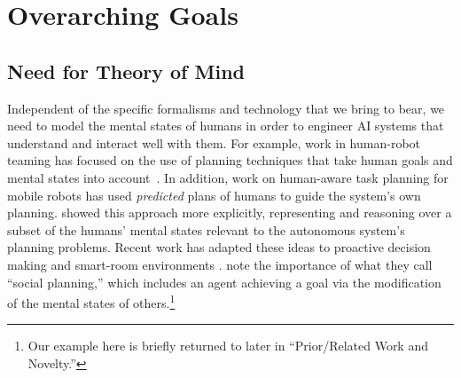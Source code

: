 \section{Overarching Goals}\label{ref:overarching_goals}

\subsection{Need for Theory of Mind}
Independent of the specific formalisms and technology
that we bring to bear, we need to
model the mental states of humans in order to engineer AI
systems that understand and interact well with them.
For example, work in human-robot teaming has focused on
the use of planning techniques that take human goals and
mental states into account~\cite{briggs_multi-modal_2012}.
In addition, work on human-aware task planning for mobile robots
\cite{cirillo2009human} has used \emph{predicted} plans of humans to
guide the system's own planning.
\cite{talamadupula2014coordination,chakraborti2015planning} showed this
approach more explicitly, representing and reasoning over a subset
of the humans' mental states relevant to the autonomous system's planning
problems.
Recent work has adapted these ideas to proactive decision making
\cite{radar2017aaaifss,kim2017aaaifss} and smart-room environments
\cite{jones2017aaaifss}.  \cite{pearce_etal_social_planning_aaai2014}
note the importance of what they call ``social planning,'' which
includes an agent achieving a goal via the modification of the mental
states of others.\footnote{Our example here is briefly returned
to later in ``Prior/Related Work and Novelty.''}

